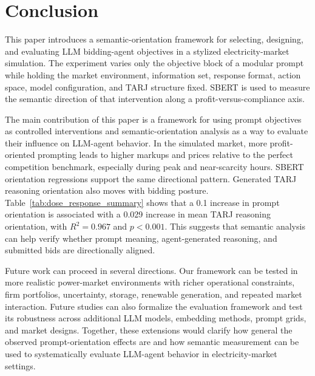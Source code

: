 \section{Conclusion}

This paper introduces a semantic-orientation framework for selecting, designing, and evaluating LLM bidding-agent objectives in a stylized electricity-market simulation. The experiment varies only the objective block of a modular prompt while holding the market environment, information set, response format, action space, model configuration, and TARJ structure fixed. SBERT is used to measure the semantic direction of that intervention along a profit-versus-compliance axis.

The main contribution of this paper is a framework for using prompt objectives as controlled interventions and semantic-orientation analysis as a way to evaluate their influence on LLM-agent behavior. In the simulated market, more profit-oriented prompting leads to higher markups and prices relative to the perfect competition benchmark, especially during peak and near-scarcity hours. SBERT orientation regressions support the same directional pattern. Generated TARJ reasoning orientation also moves with bidding posture. Table~\ref{tab:dose_response_summary} shows that a 0.1 increase in prompt orientation is associated with a 0.029 increase in mean TARJ reasoning orientation, with $R^2=0.967$ and $p<0.001$. This suggests that semantic analysis can help verify whether prompt meaning, agent-generated reasoning, and submitted bids are directionally aligned.

Future work can proceed in several directions. Our framework can be tested in more realistic power-market environments with richer operational constraints, firm portfolios, uncertainty, storage, renewable generation, and repeated market interaction. Future studies can also formalize the evaluation framework and test its robustness across additional LLM models, embedding methods, prompt grids, and market designs. Together, these extensions would clarify how general the observed prompt-orientation effects are and how semantic measurement can be used to systematically evaluate LLM-agent behavior in electricity-market settings.